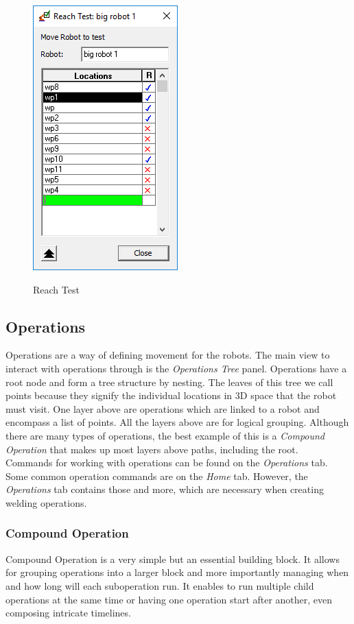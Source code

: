 \begin{figure}[H]
    \caption{Reach Test}
    \centering
    \includegraphics{reach_test}
    \label{fig:ReachTest}
\end{figure}

\subsection{Operations}
Operations are a way of defining movement for the robots.
The main view to interact with operations through is the \emph{Operations Tree} panel.
Operations have a root node and form a tree structure by nesting. The leaves of this tree we call points because they signify the individual locations in 3D space that the robot must visit. One layer above are operations which are linked to a robot and encompass a list of points. All the layers above are for logical grouping.
Although there are many types of operations, the best example of this is a \emph{Compound Operation} that makes up most layers above paths, including the root. \\

Commands for working with operations can be found on the \emph{Operations} tab. 
Some common operation commands are on the \emph{Home} tab. However, the \emph{Operations} tab contains those and more, which are necessary when creating welding operations. \\

\subsubsection{Compound Operation}
Compound Operation is a very simple but an essential building block.
It allows for grouping operations into a larger block and more importantly managing when and how long will each suboperation run.
It enables to run multiple child operations at the same time or having one operation start after another, even composing intricate timelines. \\

